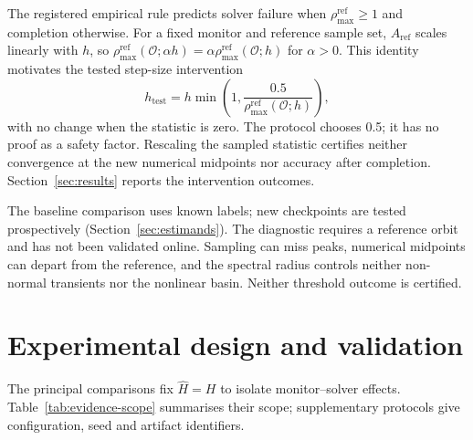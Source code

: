 \documentclass[final,3p,times]{elsarticle}
\begin{document}
The registered empirical rule predicts solver failure when
$\rho_{\max}^{\mathrm{ref}}\ge1$ and completion otherwise. For a fixed
monitor and reference sample set, $A_{\mathrm{ref}}$ scales linearly with
$h$, so $\rho_{\max}^{\mathrm{ref}}(\mathcal O;\alpha h)
=\alpha\rho_{\max}^{\mathrm{ref}}(\mathcal O;h)$ for $\alpha>0$.
This identity motivates the tested step-size intervention
\begin{equation}
 h_{\mathrm{test}}=h\min\!\left(1,
          \frac{0.5}{\rho_{\max}^{\mathrm{ref}}(\mathcal O;h)}\right),
 \label{eq:diagnostic-step-intervention}
\end{equation}
with no change when the statistic is zero. The protocol chooses 0.5;
it has no proof as a safety factor. Rescaling the sampled statistic
certifies neither convergence at the new numerical midpoints nor
accuracy after completion. Section~\ref{sec:results} reports the
intervention outcomes.

The baseline comparison uses known labels; new checkpoints are tested
prospectively (Section~\ref{sec:estimands}). The diagnostic requires a
reference orbit and has not been validated online. Sampling can miss
peaks, numerical midpoints can depart from the reference, and the spectral
radius controls neither non-normal transients nor the nonlinear basin.
Neither threshold outcome is certified.


\section{Experimental design and validation}
\label{sec:protocol}

The principal comparisons fix $\widehat H=H$ to isolate monitor--solver
effects. Table~\ref{tab:evidence-scope} summarises their scope; supplementary
protocols give configuration, seed and artifact identifiers.
\end{document}
